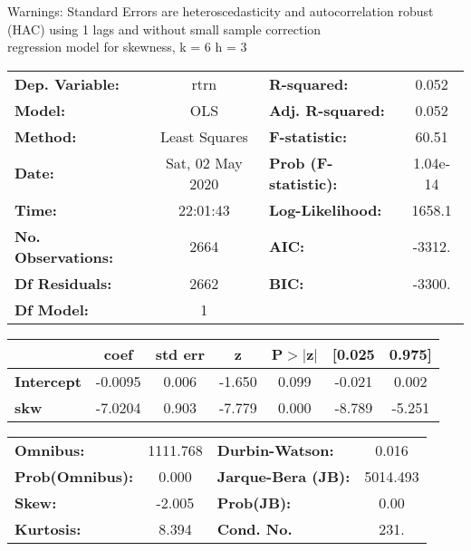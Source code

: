 Warnings: \newline
 [1] Standard Errors are heteroscedasticity and autocorrelation robust (HAC) using 1 lags and without small sample correction\\ 

regression model for skewness, k = 6 h = 3\begin{center}
\begin{tabular}{lclc}
\toprule
\textbf{Dep. Variable:}    &       rtrn       & \textbf{  R-squared:         } &     0.052   \\
\textbf{Model:}            &       OLS        & \textbf{  Adj. R-squared:    } &     0.052   \\
\textbf{Method:}           &  Least Squares   & \textbf{  F-statistic:       } &     60.51   \\
\textbf{Date:}             & Sat, 02 May 2020 & \textbf{  Prob (F-statistic):} &  1.04e-14   \\
\textbf{Time:}             &     22:01:43     & \textbf{  Log-Likelihood:    } &    1658.1   \\
\textbf{No. Observations:} &        2664      & \textbf{  AIC:               } &    -3312.   \\
\textbf{Df Residuals:}     &        2662      & \textbf{  BIC:               } &    -3300.   \\
\textbf{Df Model:}         &           1      & \textbf{                     } &             \\
\bottomrule
\end{tabular}
\begin{tabular}{lcccccc}
                   & \textbf{coef} & \textbf{std err} & \textbf{z} & \textbf{P$> |$z$|$} & \textbf{[0.025} & \textbf{0.975]}  \\
\midrule
\textbf{Intercept} &      -0.0095  &        0.006     &    -1.650  &         0.099        &       -0.021    &        0.002     \\
\textbf{skw}       &      -7.0204  &        0.903     &    -7.779  &         0.000        &       -8.789    &       -5.251     \\
\bottomrule
\end{tabular}
\begin{tabular}{lclc}
\textbf{Omnibus:}       & 1111.768 & \textbf{  Durbin-Watson:     } &    0.016  \\
\textbf{Prob(Omnibus):} &   0.000  & \textbf{  Jarque-Bera (JB):  } & 5014.493  \\
\textbf{Skew:}          &  -2.005  & \textbf{  Prob(JB):          } &     0.00  \\
\textbf{Kurtosis:}      &   8.394  & \textbf{  Cond. No.          } &     231.  \\
\bottomrule
\end{tabular}
\end{center}

